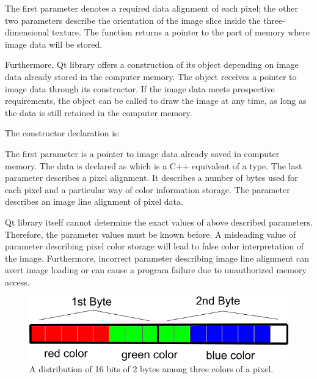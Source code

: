 
The first parameter denotes a required data alignment of each pixel; the other two parameters describe the orientation of the image slice inside the three-dimensional texture. The function returns a pointer to the part of memory where image data will be stored.

Furthermore, Qt library offers a construction of its object depending on image data already stored in the computer memory. The object receives a pointer to image data through its constructor. If the image data meets prospective requirements, the object can be called to draw the image at any time, as long as the data is still retained in the computer memory.

The constructor declaration is:


The first parameter is a pointer to image data already saved in computer memory. The data is declared as  which is a C++ equivalent of a  type. The last parameter  describes a pixel alignment. It describes a number of bytes used for each pixel and a particular way of color information storage. The  parameter describes an image line alignment of pixel data.

Qt library itself cannot determine the exact values of above described parameters. Therefore, the parameter values must be known before. A misleading value of parameter describing pixel color storage will lead to false color interpretation of the image. Furthermore, incorrect parameter describing image line alignment can avert image loading or can cause a program failure due to unauthorized memory access\cite{QtDoc}.  


\begin{figure}
	\begin{center}
	\includegraphics[width=130mm]{Text/IMG/ImageStoring_16bit.png}
	\end{center}
	\caption{A distribution of 16 bits of 2 bytes among three colors of a pixel.}
	\label{imagestoring}
\end{figure}

